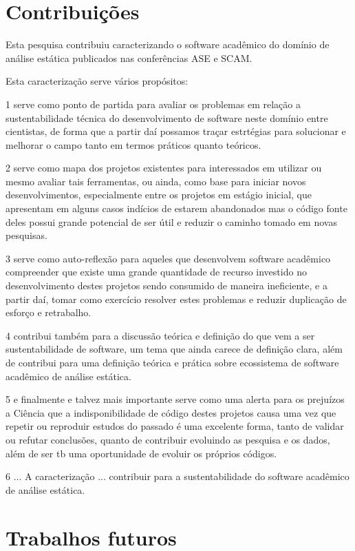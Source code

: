 \section{Contribuições}

Esta pesquisa contribuiu caracterizando o software acadêmico do domínio
de análise estática publicados nas conferências ASE e SCAM.

Esta caracterização serve vários propósitos:

1 serve como ponto de partida para avaliar os problemas em relação a sustentabilidade
técnica do desenvolvimento de software neste domínio entre cientistas, de forma
que a partir daí possamos traçar estrtégias para solucionar e melhorar o campo tanto
em termos práticos quanto teóricos.

2 serve como mapa dos projetos existentes para interessados em utilizar ou mesmo
avaliar tais ferramentas, ou ainda, como base para iniciar novos desenvolvimentos,
especialmente entre os projetos em estágio inicial, que apresentam em alguns casos
indícios de estarem abandonados mas o código fonte deles possui grande potencial
de ser útil e reduzir o caminho tomado em novas pesquisas.

3 serve como auto-reflexão para aqueles que desenvolvem software acadêmico
compreender que existe uma grande quantidade de recurso investido no desenvolvimento
destes projetos sendo consumido de maneira ineficiente, e a partir daí, tomar
como exercício resolver estes problemas e reduzir duplicação de esforço e retrabalho.

4 contribui também para a discussão teórica e definição do que vem a ser sustentabilidade
de software, um tema que ainda carece de definição clara, além de contribui para
uma definição teórica e prática sobre ecossistema de software acadêmico de análise estática.

5 e finalmente e talvez mais importante  serve como uma alerta para os prejuízos
a Ciência que a indisponibilidade de código destes projetos causa uma vez que repetir
ou reproduir estudos do passado é uma excelente forma, tanto de validar ou refutar conclusões,
quanto de contribuir evoluindo as pesquisa e os dados, além de ser tb uma oportunidade
de evoluir os próprios códigos.

6 ...  A caracterização ... contribuir para a sustentabilidade do software acadêmico
de análise estática.

\section{Trabalhos futuros}

